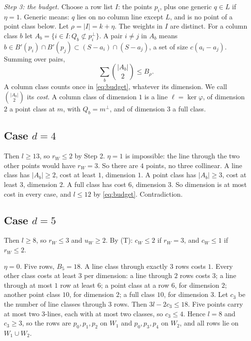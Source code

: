 \documentclass[11pt,a4paper]{article}
\theoremstyle{plain}
\theoremstyle{definition}
\begin{document}
\emph{Step 3: the budget.} Choose a row list $I$: the points $p_{i}$, plus one generic $q\in L$ if $\eta=1$. Generic means: $q$ lies on no column line except $L$, and is no point of a point class below. Let $\rho=|I|=k+\eta$. The weights in $I$ are distinct. For a column class $b$ let $A_{b}=\{i\in I:Q_{b}\not\subset p_{i}^{\perp}\}$. A pair $i\neq j$ in $A_{b}$ means $b\in B'(p_{i})\cap B'(p_{j})\subset(S-a_{i})\cap(S-a_{j})$, a set of size $c(a_{i}-a_{j})$. Summing over pairs,
\begin{equation}\label{eq:budget}
\sum_{b}\binom{|A_{b}|}{2}\le B_{\rho}. \tag{$\ddagger$}
\end{equation}
A column class counts once in \eqref{eq:budget}, whatever its dimension. We call $\binom{|A_{b}|}{2}$ its \emph{cost}. A column class of dimension $1$ is a line $\ell=\ker\varphi$, of dimension $2$ a point class at $m$, with $Q_{b}=m^{\perp}$, and of dimension $3$ a full class.

\subsection{Case $d=4$}

Then $l\ge13$, so $r_{W}\le2$ by Step 2. $\eta=1$ is impossible: the line through the two other points would have $r_{W}=3$. So there are $4$ points, no three collinear. A line class has $|A_{b}|\ge2$, cost at least $1$, dimension $1$. A point class has $|A_{b}|\ge3$, cost at least $3$, dimension $2$. A full class has cost $6$, dimension $3$. So dimension is at most cost in every case, and $l\le12$ by \eqref{eq:budget}. Contradiction.

\subsection{Case $d=5$}

Then $l\ge8$, so $r_{W}\le3$ and $u_{W}\ge2$. By (T): $c_{W}\le2$ if $r_{W}=3$, and $c_{W}\le1$ if $r_{W}\le2$.

\emph{$\eta=0$.} Five rows, $B_{5}=18$. A line class through exactly $3$ rows costs $1$. Every other class costs at least $3$ per dimension: a line through $2$ rows costs $3$; a line through at most $1$ row at least $6$; a point class at a row $6$, for dimension $2$; another point class $10$, for dimension $2$; a full class $10$, for dimension $3$. Let $c_{3}$ be the number of line classes through $3$ rows. Then $3l-2c_{3}\le18$. Five points carry at most two $3$-lines, each with at most two classes, so $c_{3}\le4$. Hence $l=8$ and $c_{3}\ge3$, so the rows are $p_{0},p_{1},p_{2}$ on $W_{1}$ and $p_{0},p_{3},p_{4}$ on $W_{2}$, and all rows lie on $W_{1}\cup W_{2}$.
\end{document}
